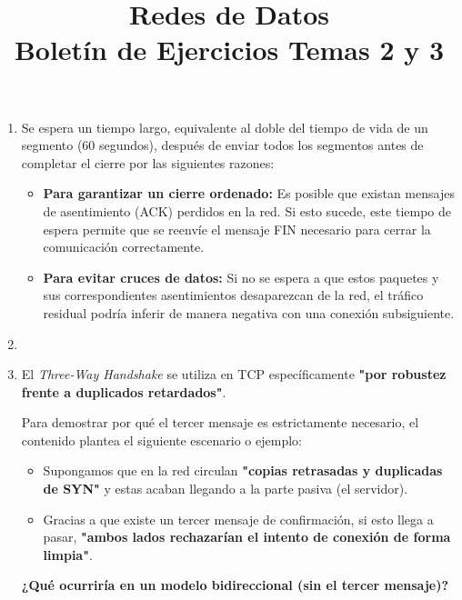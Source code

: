
\title{Redes de Datos\\Boletín de Ejercicios Temas 2 y 3}


\maketitle
\begin{enumerate}[label=\color{red}\textbf{\arabic*)}]
	\item {}

	      Se espera un tiempo largo, equivalente al doble del tiempo de vida de un segmento (60 segundos), después de enviar todos los segmentos antes de completar el cierre por las siguientes razones:
	      \begin{itemize}[label=\textbullet]
		      \item \textbf{Para garantizar un cierre ordenado:} Es posible que existan mensajes de asentimiento (ACK) perdidos en la red. Si esto sucede, este tiempo de espera permite que se reenvíe el mensaje FIN necesario para cerrar la comunicación correctamente.
		      \item \textbf{Para evitar cruces de datos:} Si no se espera a que estos paquetes y sus correspondientes asentimientos desaparezcan de la red, el tráfico residual podría inferir de manera negativa con una conexión subsiguiente.
	      \end{itemize}
	\item {}
	\item {}

	      El \textit{Three-Way Handshake} se utiliza en TCP específicamente \textbf{"por robustez frente a duplicados retardados"}.

	      Para demostrar por qué el tercer mensaje es estrictamente necesario, el contenido plantea el siguiente escenario o ejemplo:
	      \begin{itemize}[label=\textbullet]
		      \item Supongamos que en la red circulan \textbf{"copias retrasadas y duplicadas de SYN"} y estas acaban llegando a la parte pasiva (el servidor).
		      \item Gracias a que existe un tercer mensaje de confirmación, si esto llega a pasar, \textbf{"ambos lados rechazarían el intento de conexión de forma limpia"}.
	      \end{itemize}
	      \textbf{¿Qué ocurriría en un modelo bidireccional (sin el tercer mensaje)?}


\end{enumerate}
